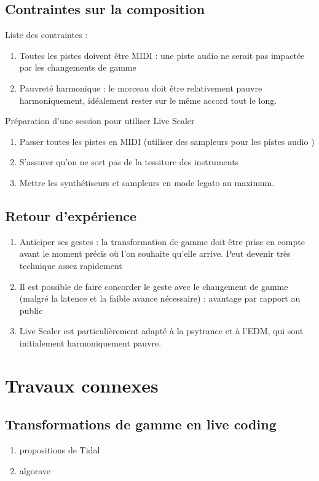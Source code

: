 \documentclass[french,11pt]{article}
\begin{document}
\subsection{Contraintes sur la composition}
Liste des contraintes :
\begin{enumerate}
  \item Toutes les pistes doivent être MIDI : une piste audio ne serait pas impactée par les changements de gamme
  \item Pauvreté harmonique : le morceau doit être relativement pauvre harmoniquement, idéalement rester sur le même accord tout le long.
\end{enumerate}
Préparation d'une session pour utiliser Live Scaler
\begin{enumerate}
  \item Passer toutes les pistes en MIDI (utiliser des sampleurs pour les pistes audio )
  \item S'assurer qu'on ne sort pas de la tessiture des instruments
  \item Mettre les synthétiseurs et sampleurs en mode legato au maximum.
\end{enumerate}
\subsection{Retour d'expérience}
\begin{enumerate}
  \item Anticiper ses gestes : la transformation de gamme doit être prise en compte avant le moment précis où l'on souhaite qu'elle arrive. Peut devenir très technique assez rapidement
  \item Il est possible de faire concorder le geste avec le changement de gamme (malgré la latence et la faible avance nécessaire) : avantage par rapport au public
  \item Live Scaler est particulièrement adapté à la psytrance et à l'EDM, qui sont initialement harmoniquement pauvre.
\end{enumerate}


\section{Travaux connexes}
\subsection{Transformations de gamme en live coding}
\begin{enumerate}
  \item propositions de Tidal
  \item algorave
\end{enumerate}
\end{document}
